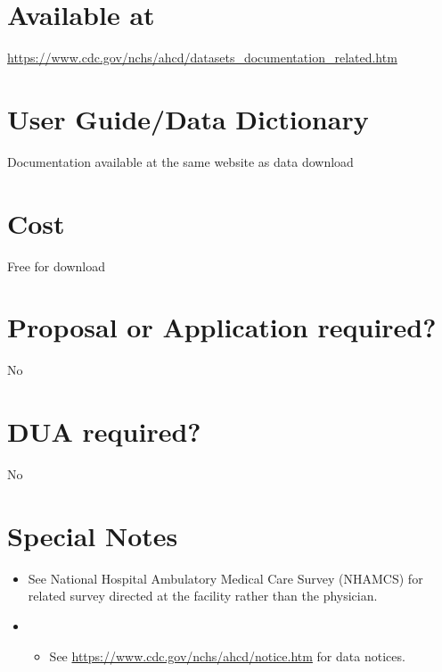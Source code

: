 \documentclass[
]{book}
\providecommand{\tightlist}{%
  \setlength{\itemsep}{0pt}\setlength{\parskip}{0pt}}
\begin{document}
\hypertarget{available-at-43}{%
\section{Available at}\label{available-at-43}}

\url{https://www.cdc.gov/nchs/ahcd/datasets_documentation_related.htm}

\hypertarget{user-guidedata-dictionary-43}{%
\section{User Guide/Data Dictionary}\label{user-guidedata-dictionary-43}}

Documentation available at the same website as data download

\hypertarget{cost-43}{%
\section{Cost}\label{cost-43}}

Free for download

\hypertarget{proposal-or-application-required-43}{%
\section{Proposal or Application required?}\label{proposal-or-application-required-43}}

No

\hypertarget{dua-required-43}{%
\section{DUA required?}\label{dua-required-43}}

No

\hypertarget{special-notes-43}{%
\section{Special Notes}\label{special-notes-43}}

\begin{itemize}
\item
  See National Hospital Ambulatory Medical Care Survey (NHAMCS) for related survey directed at the facility rather than the physician.
\item
  \begin{itemize}
  \tightlist
  \item
    See \url{https://www.cdc.gov/nchs/ahcd/notice.htm} for data notices.
  \end{itemize}
\end{itemize}
\end{document}
